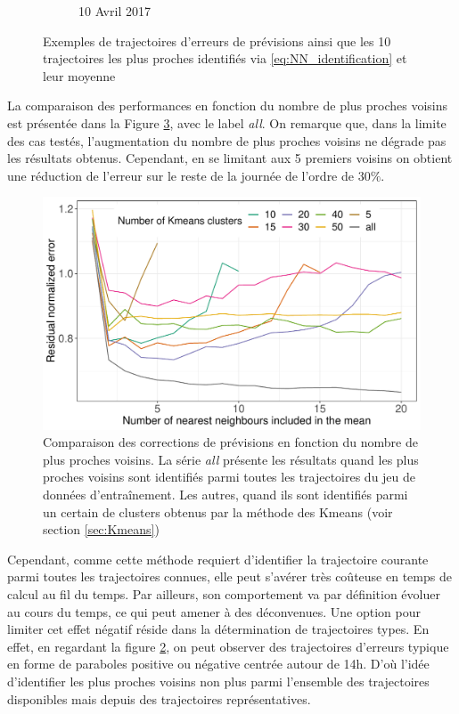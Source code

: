 \documentclass[12pt, french]{report}
\begin{document}
\begin{figure}[htb]
\begin{subfigure}[b]{0.5\linewidth}
		\caption{10 Avril 2017} 
		\label{fig:KNN_Intraday_scenarios_100417}
	\end{subfigure}%
	
	\caption{Exemples de trajectoires d'erreurs de prévisions ainsi que les 10 trajectoires les plus proches identifiés via \eqref{eq:NN_identification} et leur moyenne}
	\label{fig:KNN_Intraday_scenarios} 
\end{figure}


La comparaison des performances en fonction du nombre de plus proches voisins est présentée dans la Figure \ref{fig:KNN_Comp}, avec le label \textit{all}. On remarque que, dans la limite des cas testés, l'augmentation du nombre de plus proches voisins ne dégrade pas les résultats obtenus. Cependant, en se limitant aux 5 premiers voisins on obtient une réduction de l'erreur sur le reste de la journée de l'ordre de $30\%$.

\begin{figure}[htb]
	\centering
	\includegraphics[width=0.75\linewidth]{Images/PV/KNN/KNN_compare.pdf}
	\caption{Comparaison des corrections de prévisions en fonction du nombre de plus proches voisins. La série \textit{all} présente les résultats quand les plus proches voisins sont identifiés parmi toutes les trajectoires du jeu de données d'entraînement. Les autres, quand ils sont identifiés parmi un certain de clusters obtenus par la méthode des Kmeans (voir section \ref{sec:Kmeans})}
	\label{fig:KNN_Comp}
\end{figure}

Cependant, comme cette méthode requiert d'identifier la trajectoire courante parmi toutes les trajectoires connues, elle peut s'avérer très coûteuse en temps de calcul au fil du temps. Par ailleurs, son comportement va par définition évoluer au cours du temps, ce qui peut amener à des déconvenues. Une option pour limiter cet effet négatif réside dans la détermination de trajectoires types. En effet, en regardant la figure \ref{fig:KNN_Intraday_scenarios}, on peut observer des trajectoires d'erreurs typique en forme de paraboles positive ou négative centrée autour de 14h. D'où l'idée d'identifier les plus proches voisins non plus parmi l'ensemble des trajectoires disponibles mais depuis des trajectoires représentatives.
\end{document}
